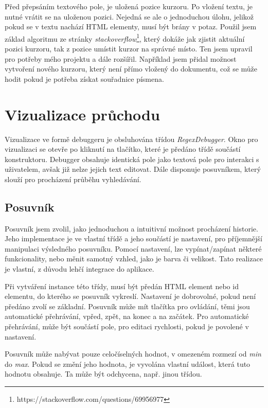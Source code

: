 Před přepsáním textového pole, je uložená pozice kurzoru.
Po vložení textu, je nutné vrátit se na uloženou pozici. 
Nejedná se ale o jednoduchou úlohu, jelikož pokud se v textu nachází HTML elementy, musí být brány v potaz.
Použil jsem základ algoritmu ze stránky \textit{stackoverflow}\footnote{https://stackoverflow.com/questions/69956977}, který dokáže jak zjistit aktuální pozici kurzoru, tak z pozice umístit kurzor na správné místo.
Ten jsem upravil pro potřeby mého projektu a dále rozšířil.
Například jsem přidal možnost vytvoření nového kurzoru, který není přímo vložený do dokumentu, což se může hodit pokud je potřeba získat souřadnice písmena.

\section{Vizualizace průchodu}

Vizualizace ve formě debuggeru je obsluhována třídou \textit{RegexDebugger}.
Okno pro vizualizaci se otevře po kliknutí na tlačítko, které je předáno třídě součástí konstruktoru.
Debugger obsahuje identická pole jako textová pole pro interakci s uživatelem, avšak již nelze jejich text editovat.
Dále disponuje posuvníkem, který slouží pro procházení průběhu vyhledávání. 

\subsection*{Posuvník}

Posuvník jsem zvolil, jako jednoduchou a intuitivní možnost procházení historie.
Jeho implementace je ve vlastní třídě a jeho součástí je nastavení, pro příjemnější manipulaci výsledného posuvníku.
Pomocí nastavení, lze vypínat/zapínat některé funkcionality, nebo měnit samotný vzhled, jako je barva či velikost.
Tato realizace je vlastní, z důvodu lehčí integrace do aplikace.

Při vytváření instance této třídy, musí být předán HTML element nebo id elementu, do kterého se posuvník vykreslí.
Nastavení je dobrovolné, pokud není předáno zvolí se základní.
Posuvník může mít tlačítka pro ovládání, těmi jsou automatické přehrávání, vpřed, zpět, na konec a na začátek.
Pro automatické přehrávání, může být součástí pole, pro editaci rychlosti, pokud je povolené v nastavení.

Posuvník může nabývat pouze celočíselných hodnot, v omezeném rozmezí od \textit{min} do \textit{max}.
Pokud se změní jeho hodnota, je vyvolána vlastní událost, která tuto hodnotu obsahuje.
Ta může být odchycena, např. jinou třídou.

